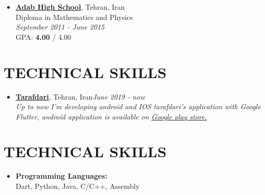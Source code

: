 \documentclass[margin]{res}
\begin{document}
\begin{resume}
\begin{itemize}
\item \textbf{\href{http://adab.sch.ir/HSchool}{Adab High School}}, Tehran, Iran\\
Diploma in Mathematics and Physics \\ \textit{September 2011 - June 2015}\\
GPA: \textbf{4.00} / 4.00

\end{itemize}



\section{TECHNICAL SKILLS}
	
\begin{itemize} \itemsep -5pt

\item \textbf{\href{https://tarafdari.com}{Tarafdari}}, Tehran, Iran\hfill \textit{June 2019 - now}\\
\textit{
Up to now I'm developing android and IOS tarafdari's application with Google Flutter,
android application is available on 
\href{https://play.google.com/store/apps/details?id=com.tarafdari.news}{Google play store.}
}

\end{itemize}



\section{TECHNICAL SKILLS}
	
\begin{itemize} \itemsep -8pt

\item \textbf{Programming Languages:}\\
Dart, Python, Java, C/C++, Assembly\\


\end{itemize}
\end{resume}
\end{document}
